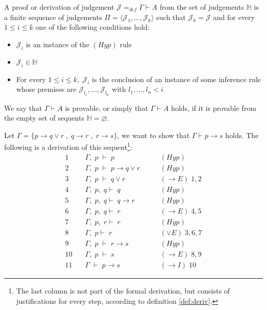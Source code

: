 \documentclass[a4paper,UKenglish]{lipics}
\newcommand{\J}{\mathcal{J}}
\newcommand{\G}{\Gamma}
\begin{document}
\begin{definition}[]\label{def:deriv}
A proof or derivation of judgement $\mathcal{J}=_{def}\G\vdash A$ from the
set of judgements $\mathbb{H}$ is a finite sequence of
judgements $\Pi=\langle \J_1,\ldots,\J_k \rangle$ such that $\J_k=\J$ and for every $1\leq i\leq k$ one of the following conditions hold:
\begin{itemize}
\item $\J_i$ is an instance of the $(Hyp)$ rule
\item $\J_i\in\mathbb{H}$
\item For every $1\leq i \leq k,\;\J_i$ is the conclusion of an instance of some inference rule whose premises are $\J_{l_1},\ldots,\J_{l_n}$ with $l_1,\ldots,l_n< i$
\end{itemize}

We say that $\G\vdash A$ is provable, or simply that $\G\vdash A$ holds, if it is provable from the empty set of sequents $\mathbb{H}=\varnothing$.
\end{definition}

\begin{example}\label{ex:wex}
Let $\G=\{p \to q \lor r \; , \; q\to r \; , \; r\to s\}$,  we want to show that $\G\vdash p\to s$ holds. The following is a derivation of this 
sequent\footnote{\noindent The last column is not part of the formal derivation, but 
consists of justifications for every step, according to definition \ref{def:deriv}.}: 
\[
\begin{array}{rll}
1 \quad & \G,\;p  \; \vdash \; p & \qquad (Hyp) \\
2 \quad & \G,\;p  \; \vdash \; p\to q\lor r & \qquad (Hyp) \\
3 \quad & \G,\;p  \; \vdash \; q\lor r & \qquad  (\to E) \; 1,2 \\
4 \quad & \G,\;p,\;q \vdash \; q & \qquad (Hyp) \\
5 \quad & \G,\;p,\;q \vdash \; q\to r & \qquad (Hyp) \\
6 \quad & \G,\;p,\;q\vdash\; r & \qquad (\to E) \; 4,5 \\
7 \quad & \G,\;p,\;r\vdash\; r & \qquad (Hyp) \\
8 \quad & \G,\;p \vdash\; r & \qquad (\lor E) \; 3,6,7  \\
9 \quad & \G,\;p\; \vdash \; r\to s & \qquad (Hyp)  \\
10 \quad & \G,\;p\; \vdash \; s & \qquad (\to E) \; 8,9  \\
11 \quad & \G\;\vdash \; p\to s &\qquad (\to I) \; 10 
\end{array}
\]
\end{example}
\end{document}
